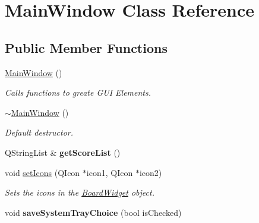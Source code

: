 \hypertarget{classMainWindow}{
\section{MainWindow Class Reference}
\label{classMainWindow}
}
\subsection*{Public Member Functions}
\begin{DoxyCompactItemize}
\item 
\hypertarget{classMainWindow_a34c4b4207b46d11a4100c9b19f0e81bb}{
\hyperlink{classMainWindow_a34c4b4207b46d11a4100c9b19f0e81bb}{MainWindow} ()}
\label{classMainWindow_a34c4b4207b46d11a4100c9b19f0e81bb}

\begin{DoxyCompactList}\small\item\em Calls functions to greate GUI Elements. \item\end{DoxyCompactList}\item 
\hypertarget{classMainWindow_ae98d00a93bc118200eeef9f9bba1dba7}{
\hyperlink{classMainWindow_ae98d00a93bc118200eeef9f9bba1dba7}{$\sim$MainWindow} ()}
\label{classMainWindow_ae98d00a93bc118200eeef9f9bba1dba7}

\begin{DoxyCompactList}\small\item\em Default destructor. \item\end{DoxyCompactList}\item 
\hypertarget{classMainWindow_a9ce3b1f12c8d7a15f7e93f36a8afeb2d}{
QStringList \& {\bfseries getScoreList} ()}
\label{classMainWindow_a9ce3b1f12c8d7a15f7e93f36a8afeb2d}

\item 
void \hyperlink{classMainWindow_a10f971ecb683f111928d2cb656cfa792}{setIcons} (QIcon $\ast$icon1, QIcon $\ast$icon2)
\begin{DoxyCompactList}\small\item\em Sets the icons in the \hyperlink{classBoardWidget}{BoardWidget} object. \item\end{DoxyCompactList}\item 
\hypertarget{classMainWindow_ab4a98deb164774bcd9785f89ecada5af}{
void {\bfseries saveSystemTrayChoice} (bool isChecked)}
\label{classMainWindow_ab4a98deb164774bcd9785f89ecada5af}


\end{DoxyCompactItemize}
